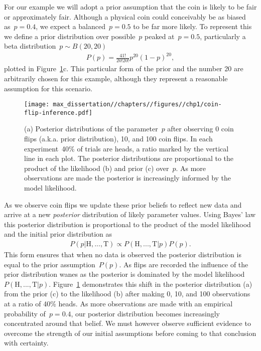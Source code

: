 For our example we will adopt a prior assumption that the coin is likely to be fair or approximately fair. Although a physical coin could conceivably be as biased as~$p = 0.4$, we expect a balanced~$p = 0.5$ to be far more likely. To represent this we define a prior distribution over possible~$p$ peaked at~$p = 0.5$, particularly a beta distribution~$p \sim B(20,20)$ \begin{align}
    P(p) = \frac{41!}{20!20!} p^{20}(1-p)^{20}, \label{eq:coin-flip-P-p}
\end{align} 
plotted in Figure~\ref{fig:coin-flip-inference}c. This particular form of the prior and the number 20 are arbitrarily chosen for this example, although they represent a reasonable assumption for this scenario. 

\begin{figure}
    \centering
    \texttt{[image: max\_dissertation//chapters//figures//chp1/coin-flip-inference.pdf]}
    \caption{(a) Posterior distributions of the parameter~$p$ after observing 0 coin flips (a.k.a. prior distribution), 10, and 100 coin flips. In each experiment~40\% of trials are heads, a ratio marked by the vertical line in each plot. The posterior distributions are proportional to the product of the likelihood (b) and prior (c) over~$p$. As more observations are made the posterior is increasingly informed by the model likelihood.}
    \label{fig:coin-flip-inference}
\end{figure}

As we observe coin flips we update these prior beliefs to reflect new data and arrive at a new \emph{posterior} distribution of likely parameter values. Using Bayes' law this posterior distribution is proportional to the product of the model likelihood and the initial prior distribution as \begin{align}
    P(p|\text{H},...,\text{T}) \propto P(\text{H},...,\text{T}|p)P(p). \label{eq:bayes-law-prop}
\end{align}
This form ensures that when no data is observed the posterior distribution is equal to the prior assumption~$P(p)$. As flips are recorded the influence of the prior distribution wanes as the posterior is dominated by the model likelihood~$P(\text{H},...,\text{T}|p)$. Figure~\ref{fig:coin-flip-inference} demonstrates this shift in the posterior distribution (a) from the prior (c) to the likelihood (b) after making 0, 10, and 100 observations at a ratio of 40\% heads. As more observations are made with an empirical probability of~$p = 0.4$, our posterior distribution becomes increasingly concentrated around that belief. We must however observe sufficient evidence to overcome the strength of our initial assumptions before coming to that conclusion with certainty.


